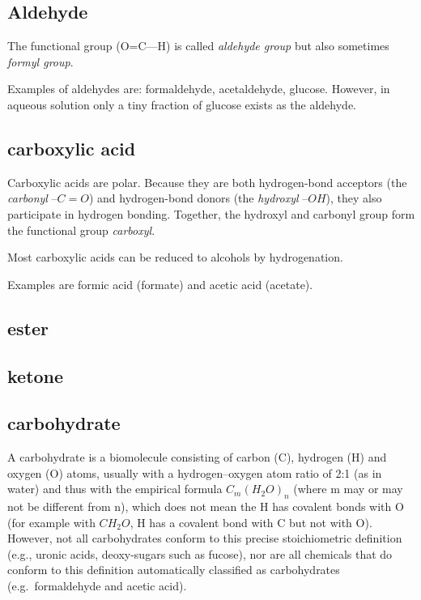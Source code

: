 \documentclass{article}
\begin{document}
\subsection{Aldehyde}


The functional group (O=C---H) is called {\em aldehyde group\/} but also sometimes {\em
formyl group}.

Examples of aldehydes are: formaldehyde, acetaldehyde, glucose. However, in aqueous
solution only a tiny fraction of glucose exists as the aldehyde.

\subsection{carboxylic acid}

Carboxylic acids are polar. Because they are both hydrogen-bond acceptors (the {\em
carbonyl\/} $–C=O$) and hydrogen-bond donors (the {\em hydroxyl\/} $–OH$), they also
participate in hydrogen bonding. Together, the hydroxyl and carbonyl group form the
functional group {\em carboxyl}.

Most carboxylic acids can be reduced to alcohols by hydrogenation.

Examples are formic acid (formate) and acetic acid (acetate).

\subsection{ester}

\subsection{ketone}

\subsection{carbohydrate}
A carbohydrate is a biomolecule consisting of carbon (C), hydrogen (H) and oxygen (O)
atoms, usually with a hydrogen–oxygen atom ratio of 2:1 (as in water) and thus with the
empirical formula $C_m{(H_2O)}_n$ (where m may or may not be different from n), which does
not mean the H has covalent bonds with O (for example with $CH_2O$, H has a covalent bond
with C but not with O). However, not all carbohydrates conform to this precise
stoichiometric definition (e.g., uronic acids, deoxy-sugars such as fucose), nor are all
chemicals that do conform to this definition automatically classified as carbohydrates
(e.g.\ formaldehyde and acetic acid).
\end{document}
